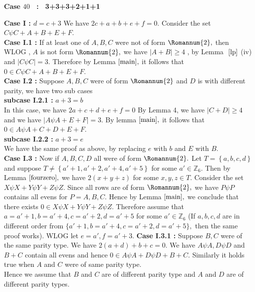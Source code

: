 \documentclass[reqno,10pt]{amsart}
\newtheorem{remar}[prop]{Remark}
\newcommand{\two}{\Romannum {2}}
\begin{document}
\begin{center}
\textbf{ Case $40$ \ : \ 3+3+3+2+1+1}
\end{center}
 	\textbf{Case I : $ d = c+3$} We have $2c+a+b+e+f = 0. $ Consider the set $ C \psi C +A+B+E+F.$\\ 
 	\textbf{Case I.1 :}  If at least one of $A,B,C$ were not of form $\two,$ then WLOG , $A$ is not form $\two,$ we have $|A + B| \geq 4 $ , by Lemma $~\ref{lp}$ (iv) and $ |C \psi C| = 3.$ Therefore by Lemma $\ref{main},$ it follows that $0 \in C \psi C +A+B+E+F.$ \\
\textbf{Case I.2 :} Suppose $A,B,C$ were of form $\two$ and $D$ is with different parity, we have two sub cases \\
 	\textbf{subcase I.2.1 :} $a+3 = b$ \\
In this case, we have $2a+c+d+e+f = 0 $  By Lemma 4, we have $ |C+D| \geq 4 $ and we have $|A \psi A + E+F| = 3.$ By lemma $\ref{main},$ it follows that $0 \in A \psi A +C+D+E+F.$ \\
 	\textbf{subcase I.2.2 :} $a+3=e$ \\
 	We have the same proof as above, by replacing $e$ with $b$ and $E$ with $B.$\\
 	\textbf{Case I.3 :} Now if $A,B,C,D$ all were of form $\two.$
Let $T = \left\lbrace a,b,c,d \right\rbrace$ and suppose $T \neq \left\lbrace a'+1,a'+2,a'+4,a'+5 \right\rbrace$ for some $a' \in \mathbb{Z}_6$. Then by Lemma $\ref{fourzero},$ we have $2(x+y+z) $ for some $x,y,z \in T$. Consider the set  $X \psi X + Y \psi Y + Z \psi Z.$ Since all rows are of form $\two,$ we have $P \psi P$ contains all evens for $P =A,B,C.$ Hence by Lemma $\ref{main},$ we conclude that there exists $ 0 \in X \psi X + Y \psi Y + Z \psi Z.$ Therefore  assume that $a=a'+1,b=a'+4,c=a'+2,d=a'+5$ for some $a' \in \mathbb{Z}_6$ (If $a,b,c,d$ are in different order from $\{ a'+1,b=a'+4,c=a'+2,d=a'+5 \},$ then the same proof works). WLOG let $e=a', f=a'+3.$ \textbf{Case I.3.1 :} Suppose $B,C$ were of the same parity type. We have $2(a+d)+b+c = 0.$  We have $A \psi A , D \psi D$ and $B+C$ contain all evens and hence $0 \in A \psi A + D \psi D + B + C.$ Similarly it holds true when $A$ and $C$ were of same parity type. \\
Hence we assume that $B$ and $C$ are of different parity  type and $A$ and $D$ are of different parity types.\\
\end{document}
